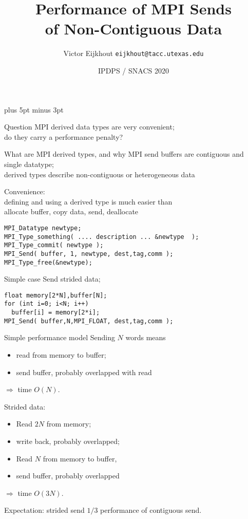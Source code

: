 \documentclass[11pt,headernav]{beamer}
\def\Location{}%
\def\Location{IPDPS / SNACS 2020}
\newcounter{tacc}
\begin{document}
\parskip=10pt plus 5pt minus 3pt

\title{Performance of MPI Sends\\ of Non-Contiguous Data}
\author{Victor Eijkhout {\tt eijkhout@tacc.utexas.edu}}
\date{\Location}

\begin{frame}
  \titlepage
\end{frame}

\begin{frame}{Question}
  MPI derived data types are very convenient;\\
  do they carry a performance penalty?
\end{frame}

\begin{frame}[containsverbatim]{What are MPI derived types, and why}
  MPI send buffers are contiguous and single datatype;\\
  derived types describe non-contiguous or heterogeneous data

  Convenience:\\
  defining and using a derived type is much easier than\\
  allocate buffer, copy data, send, deallocate
\begin{lstlisting}
MPI_Datatype newtype;    
MPI_Type_something( .... description ... &newtype  );
MPI_Type_commit( newtype );
MPI_Send( buffer, 1, newtype, dest,tag,comm );
MPI_Type_free(&newtype);
\end{lstlisting}
\end{frame}

\begin{frame}[containsverbatim]{Simple case}
  Send strided data;
\begin{lstlisting}
float memory[2*N],buffer[N];
for (int i=0; i<N; i++)
  buffer[i] = memory[2*i];
MPI_Send( buffer,N,MPI_FLOAT, dest,tag,comm );
\end{lstlisting}
\end{frame}

\begin{frame}[containsverbatim]{Simple performance model}
Sending $N$ words means
\begin{itemize}
\item read from memory to buffer;
\item send buffer, probably overlapped with read
\end{itemize}
$\Rightarrow$ time $O(N)$.

Strided data:
\begin{itemize}
\item Read $2N$ from memory;
\item write back, probably overlapped;
\item Read $N$ from memory to buffer,
\item send buffer, probably overlapped
\end{itemize}
$\Rightarrow$ time $O(3N)$.

  Expectation: strided send $1/3$ performance of contiguous send.
\end{frame}
\end{document}
